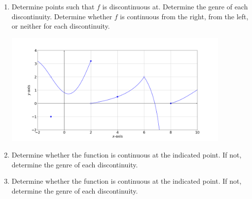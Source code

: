 \documentclass[11pt]{book}
\theoremstyle{break}
\theoremstyle{no_label}
\numberwithin{equation}{section}
\begin{document}
\begin{enumerate}[label=\arabic*.]
    \item Determine points such that $f$ is discontinuous at. Determine the genre of each discontinuity. Determine whether $f$ is continuous from the right, from the left, or neither for each discontinuity.
    \begin{center}
        \includegraphics[width=0.87\textwidth]{continuity_exercise_1.png}
    \end{center}
    \item Determine whether the function is continuous at the indicated point. If not, determine the genre of each discontinuity.
    \begin{enumerate}
    \end{enumerate}
    \item Determine whether the function is continuous at the indicated point. If not, determine the genre of each discontinuity.
    \begin{enumerate}
\end{enumerate}
\end{enumerate}
\end{document}
